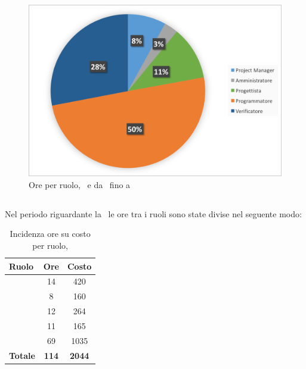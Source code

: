 \begin{figure}[H]
	\centering 
	\includegraphics[scale=0.7]{Immagini/GraficiTorteSezione6/COD.png}
	\caption{Ore per ruolo, \PD\ e \COD da \RP\ fino a \RQ}
\end{figure}

\newpage
\subsection{\VV}
Nel periodo riguardante la \VV\ le ore tra i ruoli sono state divise nel seguente modo:

\begin{table}[h]
	\begin{center}
		\begin{tabular}{|l|c|c|}
			\hline
			\textbf{Ruolo}	& \textbf{Ore} &	\textbf{Costo}	 \\
			\hline
			\textit{\Pm}	&	14	&	420		\\
			\hline
			\textit{\Am}	&	8	&	160		\\
			\hline
			\textit{\Prog}	&	12	&	264	\\
			\hline
			\textit{\Progr}	&	11	&	165	\\
			\hline
			\textit{\Ver}	&	69	&	1035	\\
			\hline
			\textbf{Totale}	&	\textbf{114}	&	\textbf{2044}	\\
			\hline
		\end{tabular}
	\end{center}
	\caption{Incidenza ore su costo per ruolo, \VV}
\end{table}

